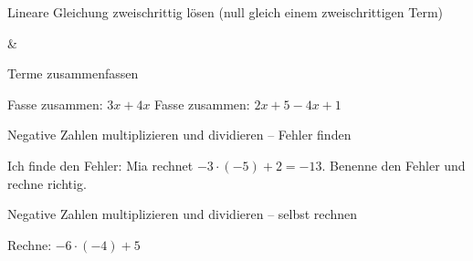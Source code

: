\begin{aufgabe}{Lineare Gleichung zweischrittig lösen (null gleich einem zweischrittigen Term)}
\begin{gleichungsraster}[2]
 &
 \\
\end{gleichungsraster}
\end{aufgabe}

\begin{aufgabe}{Terme zusammenfassen}
\begin{teile}
\teil Fasse zusammen: $3x + 4x$
\teil Fasse zusammen: $2x + 5 - 4x + 1$
\end{teile}
\end{aufgabe}

\begin{aufgabe}{Negative Zahlen multiplizieren und dividieren – Fehler finden}
\begin{teile}
\teil Ich finde den Fehler: Mia rechnet $-3 \cdot (-5) + 2 = -13$. Benenne den Fehler und rechne richtig.
\end{teile}
\end{aufgabe}

\begin{aufgabe}{Negative Zahlen multiplizieren und dividieren – selbst rechnen}
\begin{teile}
\teil Rechne: $-6 \cdot (-4) + 5$
\end{teile}
\end{aufgabe}
